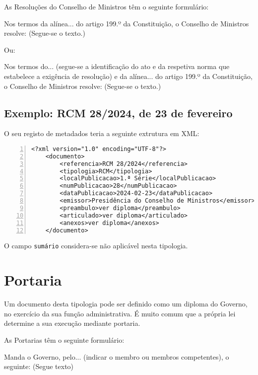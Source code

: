 As Resoluções do Conselho de Ministros têm o seguinte formulário:

\begin{quoting}
    Nos termos da alínea... do artigo 199.º da Constituição, o Conselho de Ministros 
    resolve:
        (Segue-se o texto.)
\end{quoting}

Ou:
\begin{quoting}
    Nos termos do... (segue-se a identificação do ato e da respetiva norma que 
    estabelece a exigência de resolução) e da alínea... do artigo 199.º da Constituição, 
    o Conselho de Ministros resolve:
    (Segue-se o texto.)
\end{quoting}


\subsection{Exemplo: RCM 28/2024, de 23 de fevereiro} 
    
O seu registo de metadados teria a seguinte extrutura em XML:
    
\begin{Verbatim}[frame=single, numbers=left, fontsize=\small, commandchars=\\\{\}]
<?xml version="1.0" encoding="UTF-8"?>
    <documento>
        <referencia>RCM 28/2024</referencia>
        <tipologia>RCM</tipologia>
        <localPublicacao>1.ª Série</localPublicacao>
        <numPublicacao>28</numPublicacao>
        <dataPublicacao>2024-02-23</dataPublicacao>
        <emissor>Presidência do Conselho de Ministros</emissor>
        <preambulo>ver diploma</preambulo>
        <articulado>ver diploma</articulado>
        <anexos>ver diploma</anexos>
    </documento>
\end{Verbatim}

O campo \texttt{sumário} considera-se não aplicável nesta tipologia.


\section{Portaria}

Um documento desta tipologia pode ser definido como um diploma do Governo, 
no exercício da sua função administrativa. 
É muito comum que a própria lei determine a sua execução mediante portaria.

As Portarias têm o seguinte formulário:

\begin{quoting}
    Manda o Governo, pelo... (indicar o membro ou membros competentes), 
    o seguinte: 
    (Segue texto)
\end{quoting}


